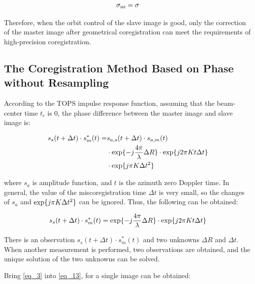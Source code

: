 \documentclass[a4paper,fleqn]{cas-sc}
\begin{document}
\begin{equation}
    \sigma_{\rm az} = \sigma
    \label{eq_11}
\end{equation}

\noindent Therefore, when the orbit control of the slave image is good, only the correction of the master image after geometrical coregistration can meet the requirements of high-precision coregistration. \par

\subsection{The Coregistration Method Based on Phase without Resampling}

According to the TOPS impulse response function, assuming that the beam-center time $t_c$ is 0, the phase difference between the master image and slave image is: \par

\begin{equation}
\begin{split}
s_s(t + \Delta t) \cdot s_m^*(t) = & s_{a, s}(t + \Delta t) \cdot s_{a, m}(t)  \\
& \cdot {\rm exp} \{-j \frac{4 \pi}{\lambda} \Delta R\} \cdot {\rm exp} \{j 2 \pi K t \Delta t\} \\
& \cdot {\rm exp} \{ j \pi K \Delta t^2\}
\end{split}
\label{eq_12}
\end{equation}

\noindent where $s_a$ is amplitude function, and $t$ is the azimuth zero Doppler time. In general, the value of the miscoregistration time $\Delta t$ is very small, so the changes of $s_a$ and ${\rm exp} \{ j \pi K \Delta t^2\}$ can be ignored. Thus, the following can be obtained: \par

\begin{equation}
    s_s(t + \Delta t) \cdot s_m^*(t) = {\rm exp} \{-j \frac{4 \pi}{\lambda} \Delta R\} \cdot {\rm exp} \{j 2 \pi K t \Delta t\}
    \label{eq_13}
\end{equation}

\noindent There is an observation $s_s(t + \Delta t) \cdot s_m^*(t)$ and two unknowns $\Delta R$ and $\Delta t$. When another measurement is performed, two observations are obtained, and the unique solution of the two unknowns can be solved. \par
Bring \ref{eq_3} into \ref{eq_13}, for a single image can be obtained: \par
\end{document}
